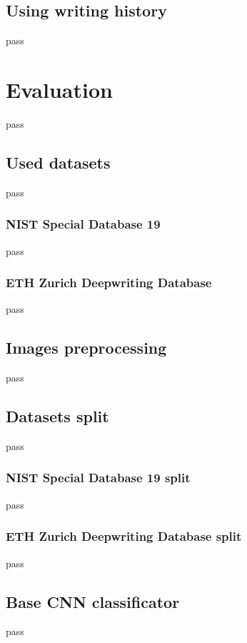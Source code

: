 \documentclass{article}
\begin{document}
\subsection{Using writing history}
pass


\section{Evaluation}
pass

\subsection{Used datasets}
pass

\subsubsection{NIST Special Database 19}
pass

\subsubsection{ETH Zurich Deepwriting Database}
pass

\subsection{Images preprocessing}
pass

\subsection{Datasets split}
pass

\subsubsection{NIST Special Database 19 split}
pass \citet{nist}

\subsubsection{ETH Zurich Deepwriting Database split}
pass \cite{deepwriting}

\subsection{Base CNN classificator}
pass
\end{document}
